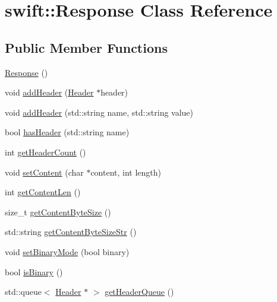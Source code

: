 \hypertarget{classswift_1_1_response}{\section{swift\-:\-:Response Class Reference}
\label{classswift_1_1_response}
}
\subsection*{Public Member Functions}
\begin{DoxyCompactItemize}
\item 
\hyperlink{classswift_1_1_response_a10f959b77214b0ea7a0ec154a76086a5}{Response} ()
\item 
void \hyperlink{classswift_1_1_response_a6e21abef101a79628db07071f98604a2}{add\-Header} (\hyperlink{classswift_1_1_header}{Header} $\ast$header)
\item 
void \hyperlink{classswift_1_1_response_ab6d61f4bc7ee54aa4b3455c2d9fa36c3}{add\-Header} (std\-::string name, std\-::string value)
\item 
bool \hyperlink{classswift_1_1_response_a1251c89c062e157c481faa6dd2034f66}{has\-Header} (std\-::string name)
\item 
int \hyperlink{classswift_1_1_response_a84de03abc1c55a7cd8f0bf0b3e22479e}{get\-Header\-Count} ()
\item 
void \hyperlink{classswift_1_1_response_a60462803819683419263b32412186c0b}{set\-Content} (char $\ast$content, int length)
\item 
int \hyperlink{classswift_1_1_response_a1e7ec1b7a0cb3b665b122b68f431ef92}{get\-Content\-Len} ()
\item 
size\-\_\-t \hyperlink{classswift_1_1_response_a63c00d2d22061d7c225ff72fa0df74d3}{get\-Content\-Byte\-Size} ()
\item 
std\-::string \hyperlink{classswift_1_1_response_a5e2b37743efe9f036b3edc5b004de18c}{get\-Content\-Byte\-Size\-Str} ()
\item 
void \hyperlink{classswift_1_1_response_a3fc7dd485e4868914ebb4458880adf89}{set\-Binary\-Mode} (bool binary)
\item 
bool \hyperlink{classswift_1_1_response_a7a63f4bd7c1c9e042b89f5185c231dd2}{is\-Binary} ()
\item 
std\-::queue$<$ \hyperlink{classswift_1_1_header}{Header} $\ast$ $>$ \hyperlink{classswift_1_1_response_ad93bf7c6d9de7c62cd8ece268e603036}{get\-Header\-Queue} ()
\end{DoxyCompactItemize}


